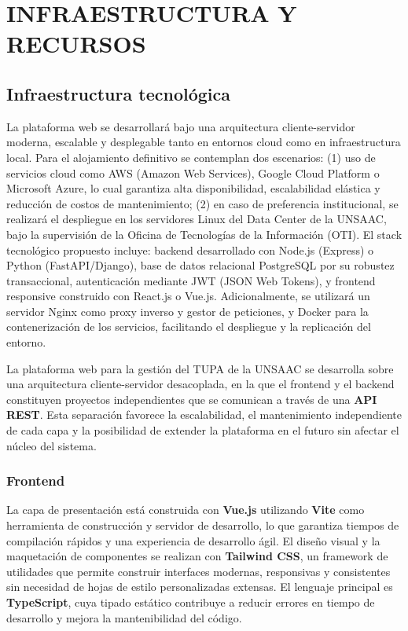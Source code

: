 \newpage

\chapter{INFRAESTRUCTURA Y RECURSOS}

\section{Infraestructura tecnológica}

La plataforma web se desarrollará bajo una arquitectura cliente-servidor moderna, escalable y 
desplegable tanto en entornos cloud como en infraestructura local. Para el alojamiento definitivo 
se contemplan dos escenarios: (1) uso de servicios cloud como AWS (Amazon Web Services), Google 
Cloud Platform o Microsoft Azure, lo cual garantiza alta disponibilidad, escalabilidad elástica y 
reducción de costos de mantenimiento; (2) en caso de preferencia institucional, se realizará el 
despliegue en los servidores Linux del Data Center de la UNSAAC, bajo la supervisión de la Oficina 
de Tecnologías de la Información (OTI). El stack tecnológico propuesto incluye: backend desarrollado 
con Node.js (Express) o Python (FastAPI/Django), base de datos relacional PostgreSQL por su robustez 
transaccional, autenticación mediante JWT (JSON Web Tokens), y frontend responsive construido con 
React.js o Vue.js. Adicionalmente, se utilizará un servidor Nginx como proxy inverso y gestor de 
peticiones, y Docker para la contenerización de los servicios, facilitando el despliegue y la replicación 
del entorno.



La plataforma web para la gestión del TUPA de la UNSAAC se desarrolla sobre una
arquitectura cliente-servidor desacoplada, en la que el frontend y el backend constituyen
proyectos independientes que se comunican a través de una \textbf{API REST}. Esta separación
favorece la escalabilidad, el mantenimiento independiente de cada capa y la posibilidad de
extender la plataforma en el futuro sin afectar el núcleo del sistema.


\subsection*{Frontend}

La capa de presentación está construida con \textbf{Vue.js} utilizando \textbf{Vite} como
herramienta de construcción y servidor de desarrollo, lo que garantiza tiempos de compilación
rápidos y una experiencia de desarrollo ágil. El diseño visual y la maquetación de componentes
se realizan con \textbf{Tailwind CSS}, un framework de utilidades que permite construir
interfaces modernas, responsivas y consistentes sin necesidad de hojas de estilo personalizadas
extensas. El lenguaje principal es \textbf{TypeScript}, cuya tipado estático contribuye a
reducir errores en tiempo de desarrollo y mejora la mantenibilidad del código.

